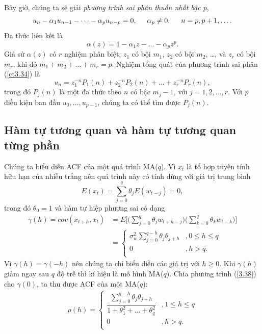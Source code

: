\documentclass[12pt, a4paper,oneside]{book}
\theoremstyle{definition}
\begin{document}
Bây giờ, chúng ta sẽ giải \textit{phương trình sai phân thuần nhất bậc $p$},
\begin{equation}
u_n-\alpha_1 u_{n-1}-\dots-\alpha_p u_{n-p}=0, \hspace{0.5cm}\alpha_p\neq 0, \hspace{0.5cm} n=p, p+1,\dots. \label{ct3.34}
\end{equation}
Đa thức liên kết là 
$$\alpha(z)=1-\alpha_1z-\dots-\alpha_pz^p.$$
Giả sử $\alpha(z)$ có $r$ nghiệm phân biệt, $z_1$ có bội $m_1$, $z_2$ có bội $m_2$, \dots, và $z_r$ có bội $m_r$, khi đó $m_1+ m_2+ \dots+ m_r=p$. Nghiệm tổng quát của phương trình sai phân (\ref{ct3.34}) là
\begin{equation}
u_n=z_1^{-n}P_1(n)+ z_2^{-n}P_{2}(n)+ \dots+ z_r^{-n}P_r(n), 
\end{equation}
trong đó $P_j(n)$ là một đa thức theo $n$ có bậc $m_j-1$, với $j=1, 2, \dots, r$. Với $p$ điều kiện ban đầu $u_0, \dots, u_{p-1}$, chúng ta có thể tìm được $P_j(n)$.

\subsection{\label{acfpacf}Hàm tự tương quan và hàm tự tương quan từng phần}
Chúng ta biểu diễn ACF của một quá trình MA($q$). Vì $x_{t}$ là tổ hợp tuyến tính hữu hạn của nhiễu trắng nên quá trình này có tính dừng với giá trị trung bình 
$$E(x_{t})= \displaystyle\sum_{j=0}^q \theta_{j}E(w_{t-j})=0,$$
trong đó $\theta_{0}=1$ và hàm tự hiệp phương sai có dạng
\begin{align}
\gamma(h)= cov (x_{t+h},x_{t}) & = E\Bigg[\bigg(\displaystyle\sum_{j=0}^{q} \theta_{j}w_{t+h-j}\bigg)\bigg(\displaystyle\sum_{k=0}^{q} \theta_{k}w_{t-k}\bigg)\Bigg]\\	
&=\begin{cases} 
\sigma_w^{2}\displaystyle\sum_{j=0}^{q-h}\theta_{j}\theta_{j+h}&, 0\leq h\leq q \\
0&, h>q. \\ 
\end{cases}
\label{3.38}
\end{align}
Vì $\gamma(h)=\gamma(-h)$ nên chúng ta chỉ biểu diễn các giá trị với $h\geq 0$. Khi $\gamma(h)$ giảm ngay sau $q$ độ trễ thì kí hiệu là mô hình MA($q$). Chia phương trình (\ref{3.38}) cho $\gamma(0)$, ta thu được ACF của một MA($q$):
\begin{align}
\rho(h) =
\begin{cases} 
\displaystyle\dfrac{\displaystyle\sum_{j=0}^{q-h}\theta_{j}\theta_{j+h}}{1+\theta_1^{2}+...+\theta_q^{2}}&, 1 \leq h \leq q\\ 
0&, h > q.\\
\end{cases}
\label{ct3.39}
\end{align}
\end{document}
